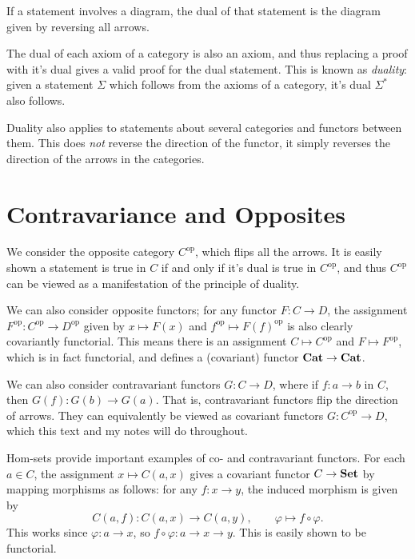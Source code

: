 If a statement involves a diagram, the dual of that statement is the diagram given by reversing all arrows.

The dual of each axiom of a category is also an axiom, and thus replacing a proof with it's dual gives a valid proof for the dual statement. This is known as \emph{duality}: given a statement $\Sigma $ which follows from the axioms of a category, it's dual $\Sigma ^*$ also follows.

Duality also applies to statements about several categories and functors between them. This does \emph{not} reverse the direction of the functor, it simply reverses the direction of the arrows in the categories.

\section{Contravariance and Opposites}

We consider the opposite category $C^{\mathrm{op} } $, which flips all the arrows. It is easily shown a statement is true in $C$ if and only if it's dual is true in $C^{\mathrm{op} } $, and thus $C^{\mathrm{op} } $ can be viewed as a manifestation of the principle of duality.

We can also consider opposite functors; for any functor $F : C \to D$, the assignment $F^{\mathrm{op} } : C^{\mathrm{op} }  \to D^{\mathrm{op} } $ given by $x\mapsto F(x)$ and $f^{\mathrm{op} } \mapsto F(f)^{\mathrm{op} } $ is also clearly covariantly functorial. This means there is an assignment $C\mapsto C^{\mathrm{op} } $ and $F\mapsto F^{\mathrm{op} } $, which is in fact functorial, and defines a (covariant) functor $\mathbf{Cat} \to \mathbf{Cat} $.

We can also consider contravariant functors $G : C \to D$, where if $f : a \to b$ in $C$, then $G(f): G(b) \to G(a)$. That is, contravariant functors flip the direction of arrows. They can equivalently be viewed as covariant functors $G : C^{\mathrm{op} }  \to D$, which this text and my notes will do throughout.

Hom-sets provide important examples of co- and contravariant functors. For each $a\in C$, the assignment $x\mapsto C(a,x)$ gives a covariant functor $C\to \mathbf{Set} $ by mapping morphisms as follows: for any $f : x \to y$, the induced morphism is given by
\[
	C(a,f): C(a,x) \to C(a,y),\qquad \varphi \mapsto f\circ \varphi 
.\]
This works since $\varphi : a \to x$, so $f\circ \varphi : a \to x \to y$. This is easily shown to be functorial.

